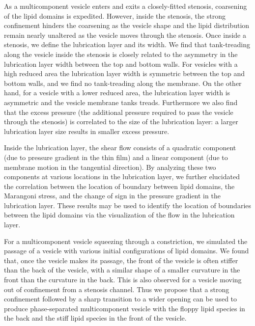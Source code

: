 \documentclass[twoside,twocolumn,9pt]{article}
\begin{document}
As a multicomponent vesicle enters and exits a closely-fitted stenosis,
coarsening of the lipid domains is expedited. However, inside the
stenosis, the strong confinement hinders the coarsening as the vesicle
shape and the lipid distribution remain nearly unaltered as the
vesicle moves through the stenosis. Once inside a stenosis, we define
the lubrication layer and its width. We find that tank-treading along
the vesicle inside the stenosis is closely related to the asymmetry in
the lubrication layer width between the top and bottom walls. For
vesicles with a high reduced area the lubrication layer width is
symmetric between the top and bottom walls, and we find no tank-treading
along the membrane. On the other hand, for a vesicle with a lower
reduced area, the lubrication layer width is asymmetric and the vesicle
membrane tanks treads. Furthermore we also find that the excess pressure
(the additional pressure required to pass the vesicle through the
stenosis) is correlated to the size of the lubrication layer: a larger
lubrication layer size results in smaller excess pressure.

Inside the lubrication layer, the shear flow consists of a quadratic
component (due to pressure gradient in the thin film) and a linear
component (due to membrane motion in the tangential direction). By
analyzing these two components at various locations in the lubrication
layer, we further elucidated the correlation between the location of
boundary between lipid domains, the Marangoni stress, and the change of
sign in the pressure gradient in the lubrication layer. These results
may be used to identify the location of boundaries between the lipid
domains via the visualization of the flow in the lubrication layer.

For a multicomponent vesicle squeezing through a constriction, we
simulated the passage of a vesicle with various initial configurations
of lipid domains. We found that, once the vesicle makes its passage, the
front of the vesicle is often stiffer than the back of the vesicle, with
a similar shape of a smaller curvature in the front than the curvature
in the back. This is also observed for a vesicle moving out of
confinement from a stenosis channel. Thus we propose that a strong
confinement followed by a sharp transition to a wider opening can be
used to produce phase-separated multicomponent vesicle with the floppy
lipid species in the back and the stiff lipid species in the front of
the vesicle.
\end{document}
